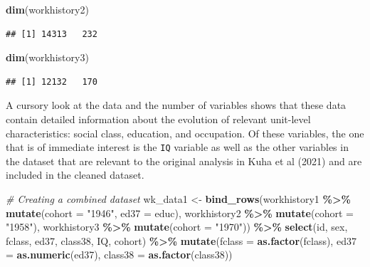 \documentclass[
]{article}
\newenvironment{Shaded}{\begin{snugshade}}{\end{snugshade}}
\newcommand{\AttributeTok}[1]{\textcolor[rgb]{0.13,0.29,0.53}{#1}}
\newcommand{\CommentTok}[1]{\textcolor[rgb]{0.56,0.35,0.01}{\textit{#1}}}
\newcommand{\FunctionTok}[1]{\textcolor[rgb]{0.13,0.29,0.53}{\textbf{#1}}}
\newcommand{\NormalTok}[1]{#1}
\newcommand{\OtherTok}[1]{\textcolor[rgb]{0.56,0.35,0.01}{#1}}
\newcommand{\SpecialCharTok}[1]{\textcolor[rgb]{0.81,0.36,0.00}{\textbf{#1}}}
\newcommand{\StringTok}[1]{\textcolor[rgb]{0.31,0.60,0.02}{#1}}
\begin{document}
\begin{Shaded}
\begin{Highlighting}[]
\FunctionTok{dim}\NormalTok{(workhistory2)}
\end{Highlighting}
\end{Shaded}

\begin{verbatim}
## [1] 14313   232
\end{verbatim}

\begin{Shaded}
\begin{Highlighting}[]
\FunctionTok{dim}\NormalTok{(workhistory3)}
\end{Highlighting}
\end{Shaded}

\begin{verbatim}
## [1] 12132   170
\end{verbatim}

A cursory look at the data and the number of variables shows that these
data contain detailed information about the evolution of relevant
unit-level characteristics: social class, education, and occupation. Of
these variables, the one that is of immediate interest is the
\texttt{IQ} variable as well as the other variables in the dataset that
are relevant to the original analysis in Kuha et al (2021) and are
included in the cleaned dataset.

\begin{Shaded}
\begin{Highlighting}[]
\CommentTok{\# Creating a combined dataset}
\NormalTok{wk\_data1 }\OtherTok{\textless{}{-}} \FunctionTok{bind\_rows}\NormalTok{(workhistory1 }\SpecialCharTok{\%\textgreater{}\%} \FunctionTok{mutate}\NormalTok{(}\AttributeTok{cohort =} \StringTok{"1946"}\NormalTok{,}
                                              \AttributeTok{ed37 =}\NormalTok{ educ), }
\NormalTok{                      workhistory2 }\SpecialCharTok{\%\textgreater{}\%} \FunctionTok{mutate}\NormalTok{(}\AttributeTok{cohort =} \StringTok{"1958"}\NormalTok{),}
\NormalTok{                      workhistory3 }\SpecialCharTok{\%\textgreater{}\%} \FunctionTok{mutate}\NormalTok{(}\AttributeTok{cohort =} \StringTok{"1970"}\NormalTok{)) }\SpecialCharTok{\%\textgreater{}\%}
  \FunctionTok{select}\NormalTok{(id, sex, fclass, ed37, class38, IQ, cohort) }\SpecialCharTok{\%\textgreater{}\%}
  \FunctionTok{mutate}\NormalTok{(}\AttributeTok{fclass =} \FunctionTok{as.factor}\NormalTok{(fclass),}
         \AttributeTok{ed37 =} \FunctionTok{as.numeric}\NormalTok{(ed37),}
         \AttributeTok{class38 =} \FunctionTok{as.factor}\NormalTok{(class38))}
\end{Highlighting}
\end{Shaded}
\end{document}
